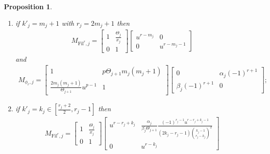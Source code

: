 \documentclass[11pt]{amsart}
\theoremstyle{definition}
\numberwithin{equation}{subsection}
\theoremstyle{plain}
\theoremstyle{plain}
\theoremstyle{plain}
\theoremstyle{plain}
\theoremstyle{plain}
\theoremstyle{plain}
\theoremstyle{plain}
\theoremstyle{plain}
\newtheorem{prop}[equation]{Proposition}
\theoremstyle{plain}
\theoremstyle{plain}
\theoremstyle{plain}
\theoremstyle{plain}
\theoremstyle{definition}
\theoremstyle{definition}
\theoremstyle{definition}
\theoremstyle{remark}
\renewcommand{\(}{\textup{(}}
\renewcommand{\)}{\textup{)}}
\newcommand{\Fil}{\mathrm{Fil}}
\begin{document}
\begin{prop}
\begin{enumerate}[leftmargin=*]
\begin{align*}
    M_{\phi_r,j}=
        \begin{bmatrix}
            1 & -p\Theta_{j+1}m_j^2(H_{m_j}+H_{m_j-1}) \\
            \frac{2m_j^2-1}{\Theta_{j+1}}u^{p-1} & 1
        \end{bmatrix}
        \begin{bmatrix}
            0 & \alpha_j (-1)^r m_j \\
            \beta_j \frac{(-1)^{r+1}}{m_j} & 0
        \end{bmatrix};
    \end{align*}
\item if $k'_j=m_j+1$ with $r_j=2m_j+1$ then
    \begin{align*}
    M_{\Fil^r,j}
        =
        \begin{bmatrix}
            1 & \frac{\Theta_j}{x_j} \\
            0 & 1
        \end{bmatrix}
        \begin{bmatrix}
            u^{r-m_j} & 0 \\
            0 & u^{r-m_j-1}
        \end{bmatrix}
    \end{align*}
    and
    \begin{align*}
    M_{\phi_r,j}
        =
        \begin{bmatrix}
            1 & p\Theta_{j+1}m_j(m_j+1) \\
            \frac{2m_j(m_j+1)}{\Theta_{j+1}}u^{p-1} & 1
        \end{bmatrix}
        \begin{bmatrix}
            0 & \alpha_j (-1)^{r+1} \\
            \beta_j (-1)^{r+1} & 0
        \end{bmatrix};
    \end{align*}
\item if $k'_j=k_j\in [\frac{r_j+2}{2}, r_j-1]$ then
    \begin{align*}
    M_{\Fil^r,j}
        =
        \begin{bmatrix}
            1 & \frac{\Theta_j}{x_j} \\
            0 & 1
        \end{bmatrix}
        \begin{bmatrix}
            u^{r-r_j+k_j}
             & \frac{\alpha_j}{\beta_j\Theta_{j+1}}\frac{(-1)^{r_j-1}u^{r-r_j+k_j-1}}{(2k_j-r_j-1)\binom{k_j-1}{r_j-k_j}^2} \\
            0 & u^{r-k_j}

\end{bmatrix}
\end{align*}
\end{enumerate}
\end{prop}
\end{document}
